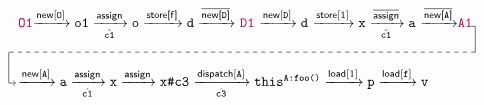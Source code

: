 {
\setlength{\abovedisplayskip}{.8ex}
\setlength{\belowdisplayskip}{.8ex}
\begin{equation}
  \centering
\label{eq:ex-patho1-to-v-duplicate}
\begin{tabular}{l} 
\vspace*{1ex}
\commentfont{O1}$\xrightarrow{\new[\texttt{O}]}
\texttt{o1}\xrightarrow[\hat{\mathtt{c1}}]{\assign}
\texttt{o} \xrightarrow{\storefield{f}} \texttt{d}
\xrightarrow{\inewfield{\texttt{D}}}$ \commentfont{D1} 
$\xrightarrow{\new[\texttt{D}]} 
\texttt{d}$ $\xrightarrow{\store[1]}\texttt{x}\xrightarrow[\check{\texttt{c1}}]{\iassign}\texttt{a} $ $\xrightarrow{\inewfield{\texttt{A}}}$\commentfont{A1} \\[5ex]
\begin{tikzpicture}[-, remember picture,overlay]
\def\lx{11.5}\def\ly{1.5}
\def\dy{.85}\def\ny{.07}
\draw(\lx, \ly) -- (\lx+.1, \ly) -- (\lx+.1, \dy);
\draw[dashed] (\lx+.1, \dy) -- (-.12,\dy);
\draw(-.12,\dy) -- (-.12, \ny);
\draw[->] (-.12, \ny) -- (0.06, \ny);
\end{tikzpicture}
$\xrightarrow{\new[\texttt{A}]}\texttt{a}\xrightarrow[\hat{\texttt{c1}}]{\assign}\texttt{x} \xrightarrow{\assign} \texttt{x\#c3}$ $\xrightarrow[\hat{\texttt{c3}}]{\indispatch[\texttt{A}]}\texttt{this}^\texttt{A:foo()}
\xrightarrow{\load[1]}\texttt{p}
    \xrightarrow{\load[\texttt{f}]} \texttt{v}$ \\[3ex]
\end{tabular}
\end{equation}
}
\hspace*{-1.1ex}


